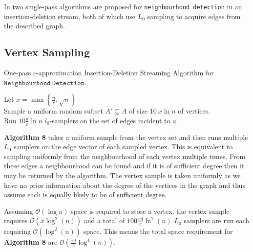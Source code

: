 \documentclass[11pt,twoside,a4paper]{report}
\begin{document}

In \cite{orig} two single-pass algorithms are proposed for \texttt{neighbourhood detection} in an insertion-deletion stream, both of which use $L_0$ sampling to acquire edges from the described graph.

\subsection{Vertex Sampling}

\begin{algorithm}
	\caption{One-pass $c$-approximation Insertion-Deletion Streaming Algorithm for $\mathtt{Neighbourhood\ Detection}$. }
	Let $x=\max\left\{\frac{n}{c},\sqrt{n}\right\}$\\
	Sample a uniform random subset $A'\subseteq A$ of size $10\ x\ln n$ of vertices.\\
	 {
		Run $10\frac{d}{c}\ln n$ $l_0$-samplers on the set of edges incident to $a$.
	}
\end{algorithm}
\par\textbf{Algorithm 8} takes a uniform sample from the vertex set and then runs multiple $L_0$ samplers on the edge vector of each sampled vertex. This is equivalent to sampling uniformly from the neighbourhood of each vertex multiple times. From these edges a neighbourhood can be found and if it is of sufficient degree then it may be returned by the algorithm. The vertex sample is taken uniformly as we have no prior information about the degree of the vertices in the graph and thus assume each is equally likely to be of sufficient degree.

\par Assuming $\mathcal{O}(\log n)$ space is required to store a vertex, the vertex sample requires $\mathcal{O}(x\log^2(n))$ and a total of $100\frac{xd}{c}\ln^2(n)$ $L_0$ samplers are run each requiring $\mathcal{O}(\log^2(n))$ space. This means the total space requirement for \textbf{Algorithm 8} are $\mathcal{O}(\frac{xd}{c}\log^4(n))$.
\end{document}
